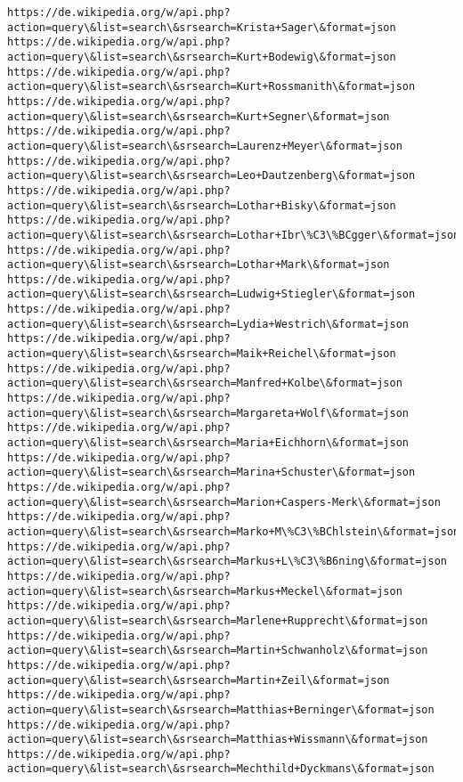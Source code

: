 \documentclass[11pt]{article}
\begin{document}
\begin{Verbatim}[commandchars=\\\{\}]
https://de.wikipedia.org/w/api.php?action=query\&list=search\&srsearch=Krista+Sager\&format=json
https://de.wikipedia.org/w/api.php?action=query\&list=search\&srsearch=Kurt+Bodewig\&format=json
https://de.wikipedia.org/w/api.php?action=query\&list=search\&srsearch=Kurt+Rossmanith\&format=json
https://de.wikipedia.org/w/api.php?action=query\&list=search\&srsearch=Kurt+Segner\&format=json
https://de.wikipedia.org/w/api.php?action=query\&list=search\&srsearch=Laurenz+Meyer\&format=json
https://de.wikipedia.org/w/api.php?action=query\&list=search\&srsearch=Leo+Dautzenberg\&format=json
https://de.wikipedia.org/w/api.php?action=query\&list=search\&srsearch=Lothar+Bisky\&format=json
https://de.wikipedia.org/w/api.php?action=query\&list=search\&srsearch=Lothar+Ibr\%C3\%BCgger\&format=json
https://de.wikipedia.org/w/api.php?action=query\&list=search\&srsearch=Lothar+Mark\&format=json
https://de.wikipedia.org/w/api.php?action=query\&list=search\&srsearch=Ludwig+Stiegler\&format=json
https://de.wikipedia.org/w/api.php?action=query\&list=search\&srsearch=Lydia+Westrich\&format=json
https://de.wikipedia.org/w/api.php?action=query\&list=search\&srsearch=Maik+Reichel\&format=json
https://de.wikipedia.org/w/api.php?action=query\&list=search\&srsearch=Manfred+Kolbe\&format=json
https://de.wikipedia.org/w/api.php?action=query\&list=search\&srsearch=Margareta+Wolf\&format=json
https://de.wikipedia.org/w/api.php?action=query\&list=search\&srsearch=Maria+Eichhorn\&format=json
https://de.wikipedia.org/w/api.php?action=query\&list=search\&srsearch=Marina+Schuster\&format=json
https://de.wikipedia.org/w/api.php?action=query\&list=search\&srsearch=Marion+Caspers-Merk\&format=json
https://de.wikipedia.org/w/api.php?action=query\&list=search\&srsearch=Marko+M\%C3\%BChlstein\&format=json
https://de.wikipedia.org/w/api.php?action=query\&list=search\&srsearch=Markus+L\%C3\%B6ning\&format=json
https://de.wikipedia.org/w/api.php?action=query\&list=search\&srsearch=Markus+Meckel\&format=json
https://de.wikipedia.org/w/api.php?action=query\&list=search\&srsearch=Marlene+Rupprecht\&format=json
https://de.wikipedia.org/w/api.php?action=query\&list=search\&srsearch=Martin+Schwanholz\&format=json
https://de.wikipedia.org/w/api.php?action=query\&list=search\&srsearch=Martin+Zeil\&format=json
https://de.wikipedia.org/w/api.php?action=query\&list=search\&srsearch=Matthias+Berninger\&format=json
https://de.wikipedia.org/w/api.php?action=query\&list=search\&srsearch=Matthias+Wissmann\&format=json
https://de.wikipedia.org/w/api.php?action=query\&list=search\&srsearch=Mechthild+Dyckmans\&format=json

\end{Verbatim}
\end{document}
